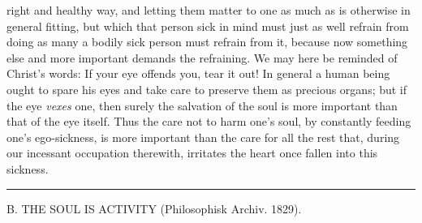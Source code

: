 \documentclass[12pt,a4paper,openany]{book}
\newcommand{\excerpthead}[1]{\par\bigskip\begin{center}#1\end{center}\nopagebreak\smallskip}
\newcommand{\sectionrule}{\par\begin{center}\rule{4em}{0.4pt}\end{center}}
\begin{document}
right and healthy way, and letting them matter to one as much as is otherwise in
general fitting, but which that person sick in mind must just as well refrain from
doing as many a bodily sick person must refrain from it, because now something else
and more important demands the refraining. We may here be reminded of Christ's
words: If your eye offends you, tear it out! In general a human being ought to spare
his eyes and take care to preserve them as precious organs; but if the eye
\emph{vexes} one, then surely the salvation of the soul is more important than that
of the eye itself. Thus the care not to harm one's soul, by constantly feeding one's
ego-sickness, is more important than the care for all the rest that, during our
incessant occupation therewith, irritates the heart once fallen into this sickness.

\sectionrule

\excerpthead{B. THE SOUL IS ACTIVITY (Philosophisk Archiv. 1829).}
\end{document}
